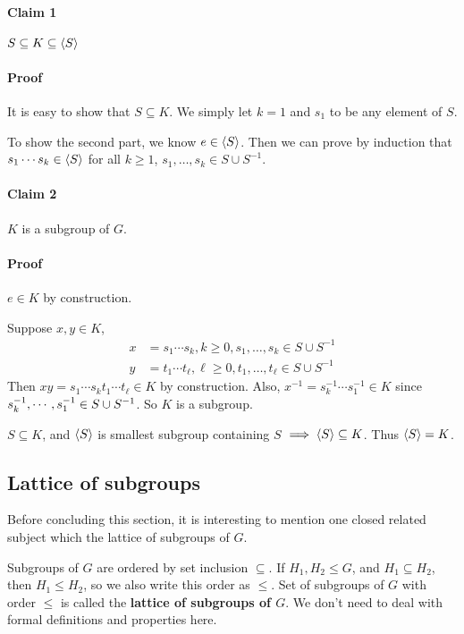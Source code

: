 \begin{pf}
\paragraph{Claim 1} $S\subseteq K\subseteq \left\langle S \right\rangle$

\paragraph{Proof} It is easy to show that $S\subseteq K$. We simply let $k=1$ and $s_1$ to be any element of $S$.

To show the second part, we know $e\in \left\langle S \right\rangle$. Then we can prove by induction that $s_1\cdots s_k \in \left\langle S \right\rangle$ for all $k\ge 1$, $s_1,\ldots, s_k\in S\cup S^{-1}$. \claim 

\paragraph{Claim 2} $K$ is a subgroup of $G$.

\paragraph{Proof} $e\in K$ by construction.

Suppose $x,y\in K$,
$$
\begin{aligned}
x &= s_1\cdots s_k, k\ge 0, s_1,\ldots, s_k\in S\cup S^{-1}\\
y & = t_1 \cdots t_\ell, \ell \ge 0, t_1,\ldots,t_\ell\in  S\cup S^{-1}
\end{aligned}
$$
Then $xy = s_1\cdots s_k t_1 \cdots t_\ell \in K$ by construction. Also, $x^{-1} = s_k^{-1} \cdots s_1^{-1} \in K$ since $s_k^{-1},\cdots,s_1^{-1} \in S\cup S^{-1}$. So $K$ is a subgroup. \claim

$S\subseteq K$, and $\left\langle S \right\rangle$ is smallest subgroup containing $S$ $\implies \left\langle S \right\rangle\subseteq K$. Thus $\left\langle S \right\rangle=K$.
\end{pf}

\subsection{Lattice of subgroups}
Before concluding this section, it is interesting to mention one closed related subject which the lattice of subgroups of $G$. 

Subgroups of $G$ are ordered by set inclusion $\subseteq$. If $H_1,H_2\le G$, and $H_1\subseteq H_2$, then $H_1\le H_2$, so we also write this order as $\le$. Set of subgroups of $G$ with order $\le$ is called the \textbf{lattice of subgroups of $G$}. We don't need to deal with formal definitions and properties here.

